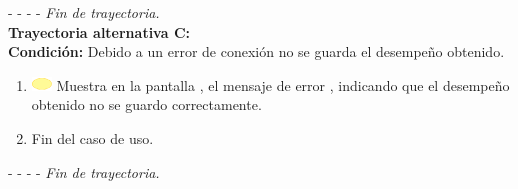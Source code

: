 - - - - \textit{Fin de trayectoria.} \\

\textbf{\large{Trayectoria alternativa C:}}\\
\textbf{Condición: } Debido a un error de conexión no se guarda el desempeño obtenido.

\begin{enumerate}
	\item \includegraphics[width=15pt]{./Figuras/iconosCU/herramienta.png} Muestra en la pantalla , el mensaje de error , indicando que el desempeño obtenido no se guardo correctamente.
	\item Fin del caso de uso.
\end{enumerate}

- - - - \textit{Fin de trayectoria.} \\

\clearpage